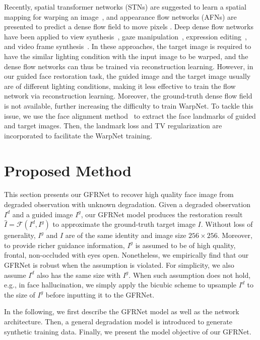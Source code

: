 \documentclass[runningheads]{llncs}
\begin{document}
Recently, spatial transformer networks (STNs) are suggested to learn a spatial mapping for warping an image~\cite{jaderberg2015spatial}, and appearance flow networks (AFNs) are presented to predict a dense flow field to move pixels \cite{zhou2016view,ganin2016deepwarp}.
Deep dense flow networks have been applied to view synthesis~\cite{zhou2016view,park2017cvpr}, gaze manipulation~\cite{ganin2016deepwarp}, expression editing~\cite{yeh2016semantic}, and video frame synthesis~\cite{liu2017iccv}.
In these approaches, the target image is required to have the similar lighting condition with the input image to be warped, and the dense flow networks can thus be trained via reconstruction learning.
However, in our guided face restoration task, the guided image and the target image usually are of different lighting conditions, making it less effective to train the flow network via reconstruction learning.
Moreover, the ground-truth dense flow field is not available, further increasing the difficulty to train WarpNet.
To tackle this issue, we use the face alignment method~\cite{TCDCN} to extract the face landmarks of guided and target images.
Then, the landmark loss and TV regularization are incorporated to facilitate the WarpNet training.
\section{Proposed Method}\label{section3}
This section presents our GFRNet to recover high quality face image from degraded observation with unknown degradation. Given a degraded observation $I^d$ and a guided image $I^g$, our GFRNet model produces the restoration result $\hat{I} = \mathcal{F}(I^d, I^g)$ to approximate the ground-truth target image $I$.
Without loss of generality, $I^g$ and $I$ are of the same identity and image size $256 \times 256$.
Moreover, to provide richer guidance information, $I^g$ is assumed to be of high quality, frontal, non-occluded with eyes open.
Nonetheless, we empirically find that our GFRNet is robust when the assumption is violated.
For simplicity, we also assume $I^d$ also has the same size with $I^g$.
When such assumption does not hold, e.g., in face hallucination, we simply apply the bicubic scheme to upsample $I^d$ to the size of $I^g$ before inputting it to the GFRNet.


In the following, we first describe the GFRNet model as well as the network architecture.
Then, a general degradation model is introduced to generate synthetic training data. Finally, we present the model objective of our GFRNet.
\end{document}
